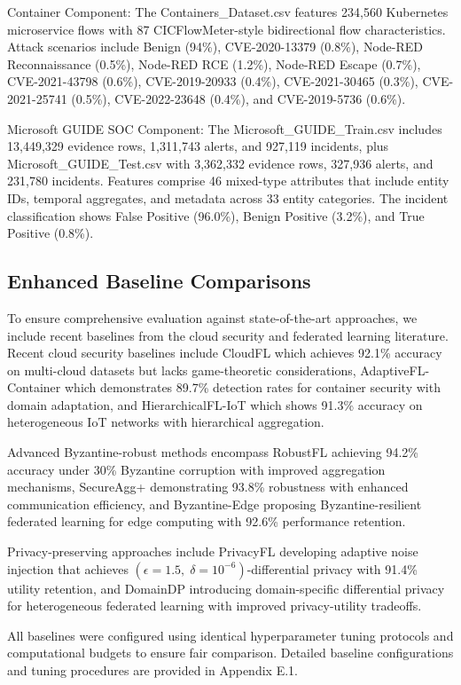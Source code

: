 \documentclass[12pt,a4paper]{article}
\theoremstyle{definition}
\begin{document}
Container Component: The Containers\_Dataset.csv features 234,560 Kubernetes microservice flows with 87 CICFlowMeter-style bidirectional flow characteristics. Attack scenarios include Benign (94\%), CVE-2020-13379 (0.8\%), Node-RED Reconnaissance (0.5\%), Node-RED RCE (1.2\%), Node-RED Escape (0.7\%), CVE-2021-43798 (0.6\%), CVE-2019-20933 (0.4\%), CVE-2021-30465 (0.3\%), CVE-2021-25741 (0.5\%), CVE-2022-23648 (0.4\%), and CVE-2019-5736 (0.6\%).

Microsoft GUIDE SOC Component: The Microsoft\_GUIDE\_Train.csv includes 13,449,329 evidence rows, 1,311,743 alerts, and 927,119 incidents, plus Microsoft\_GUIDE\_Test.csv with 3,362,332 evidence rows, 327,936 alerts, and 231,780 incidents. Features comprise 46 mixed-type attributes that include entity IDs, temporal aggregates, and metadata across 33 entity categories. The incident classification shows False Positive (96.0\%), Benign Positive (3.2\%), and True Positive (0.8\%).

\subsection{Enhanced Baseline Comparisons}

To ensure comprehensive evaluation against state-of-the-art approaches, we include recent baselines from the cloud security and federated learning literature. Recent cloud security baselines include CloudFL which achieves 92.1\% accuracy on multi-cloud datasets but lacks game-theoretic considerations, AdaptiveFL-Container which demonstrates 89.7\% detection rates for container security with domain adaptation, and HierarchicalFL-IoT which shows 91.3\% accuracy on heterogeneous IoT networks with hierarchical aggregation.

Advanced Byzantine-robust methods encompass RobustFL achieving 94.2\% accuracy under 30\% Byzantine corruption with improved aggregation mechanisms, SecureAgg+ demonstrating 93.8\% robustness with enhanced communication efficiency, and Byzantine-Edge proposing Byzantine-resilient federated learning for edge computing with 92.6\% performance retention.

Privacy-preserving approaches include PrivacyFL developing adaptive noise injection that achieves $(\epsilon = 1.5,\; \delta = 10^{-6})$-differential privacy with 91.4\% utility retention, and DomainDP introducing domain-specific differential privacy for heterogeneous federated learning with improved privacy-utility tradeoffs.

All baselines were configured using identical hyperparameter tuning protocols and computational budgets to ensure fair comparison. Detailed baseline configurations and tuning procedures are provided in Appendix E.1.
\end{document}
